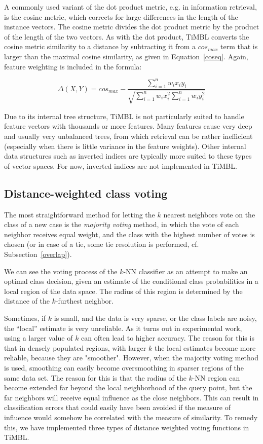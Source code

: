 \documentclass{report}
\begin{document}
A commonly used variant of the dot product metric, e.g. in information
retrieval, is the cosine metric, which corrects for large differences
in the length of the instance vectors. The cosine metric divides the
dot product metric by the product of the length of the two vectors. As
with the dot product, TiMBL converts the cosine metric similarity to a
distance by subtracting it from a $cos_{max}$ term that is larger than
the maximal cosine similarity, as given in
Equation~\ref{coseq}. Again, feature weighting is included in the
formula:

\begin{equation}
\label{coseq}
\Delta(X,Y) = cos_{max} - \frac{\sum_{i=1}^{n} w_{i} x_{i} y_{i}}{\sqrt{\sum_{i=1}^{n} w_{i} x_{i}^2 \sum_{i=1}^{n} w_{i} y_{i}^2}}
\end{equation}

Due to its internal tree structure, TiMBL is not particularly suited
to handle feature vectors with thousands or more features. Many features
cause very deep and usually very unbalanced trees, from which
retrieval can be rather inefficient (especially when there is little
variance in the feature weights). Other internal data structures such as
inverted indices are typically more suited to these types of vector
spaces. For now, inverted indices are not implemented in TiMBL.

\subsection{Distance-weighted class voting}
\label{distweightvote}

The most straightforward method for letting the $k$ nearest neighbors
vote on the class of a new case is the {\em majority voting} method,
in which the vote of each neighbor receives equal weight, and the
class with the highest number of votes is chosen (or in case of a tie,
some tie resolution is performed, cf. Subsection~\ref{overlap}).

We can see the voting process of the $k$-NN classifier as an attempt
to make an optimal class decision, given an estimate of the
conditional class probabilities in a local region of the data space.
The radius of this region is determined by the distance of the
$k$-furthest neighbor.

Sometimes, if $k$ is small, and the data is very sparse, or the class
labels are noisy, the ``local'' estimate is very unreliable.  As it
turns out in experimental work, using a larger value of $k$ can often
lead to higher accuracy. The reason for this is that in densely
populated regions, with larger $k$ the local estimates become more
reliable, because they are "smoother".  However, when the majority
voting method is used, smoothing can easily become oversmoothing in
sparser regions of the same data set. The reason for this is that the
radius of the $k$-NN region can become extended far beyond the local
neighborhood of the query point, but the far neighbors will receive
equal influence as the close neighbors. This can result in
classification errors that could easily have been avoided if the
measure of influence would somehow be correlated with the measure of
similarity. To remedy this, we have implemented three types of distance 
weighted voting functions in TiMBL.
\end{document}
